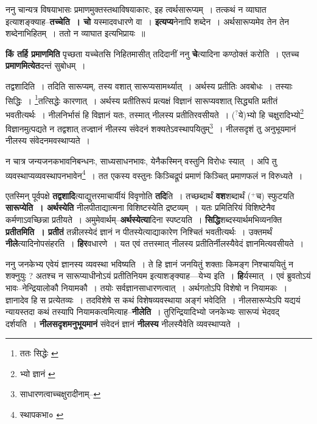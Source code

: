 \documentclass[article,12pt,a4paper]{memoir}
\newcommand{\unclear}[1]{($^{?}$#1)}
\newcommand{\add}[1]{($^{+}$#1)}
\begin{document}
	  \pstart ननु चान्यत्र विषयाभासः प्रमाणमुक्तस्तथाविषयाकारः, इह त्वर्थसारूप्यम् । तत्कथं न व्याघात इत्याशङ्क्याह--\textbf{तच्चेति । चो} यस्मादवधारणे वा । \textbf{इत्यप्य}नेनापि शब्देन । अर्थसारूप्यमेव तेन तेन शब्देनाभिहितम् । ततो न व्याघात इत्यभिप्रायः ॥
	\pend
      

	  \pstart \textbf{किं तर्हि प्रमाणमिति} पृच्छता यच्चेतसि निहितमासीत् तदिदानीं ननु \textbf{चे}त्यादिना कण्ठोक्तं करोति । एतच्च \textbf{प्रमाणमित्येत}दन्तं सुबोधम् ।
	\pend
	  \bigskip
	  \begingroup
	

	  \pstart तद्वशादिति । तदिति सारूप्यम्, तस्य वशात् सारूप्यसामर्थ्यात् । अर्थस्य प्रतीतिः अवबोधः । तस्याः सिद्धिः । \footnote{ततः सिद्धेः \cite{dp-msB}}\-तत्सिद्धेः कारणात् । अर्थस्य प्रतीतिरूपं प्रत्यक्षं विज्ञानं सारूप्यवशात् सिद्ध्यति प्रतीतं भवतीत्यर्थः । नीलनिर्भासं हि विज्ञानं यतः, तस्मात् नीलस्य प्रतीतिरवसीयते । \unclear{ये}भ्यो हि चक्षुरादिभ्यो\footnote{भ्यो ज्ञानं \cite{dp-msD} \cite{dp-msB}} विज्ञानमुत्पद्यते न तद्वशात् तज्ज्ञानं नीलस्य संवेदनं शक्यतेऽवस्थापयितुम्\footnote{साधारणत्वाच्चक्षुरादीनाम्--\cite{dp-msD-n}} । नीलसदृशं तु अनुभूयमानं नीलस्य संवेदनमवस्थाप्यते ।
	\pend
       

	  \pstart न चात्र जन्यजनकभावनिबन्धनः, साध्यसाधनभावः, येनैकस्मिन् वस्तुनि विरोधः स्यात् । अपि तु व्यवस्थाप्यव्यवस्थापनभावेन\footnote{स्थापकभा० \cite{dp-msA} \cite{dp-msB} \cite{dp-msC} \cite{dp-msD} \cite{dp-edP} \cite{dp-edE} \cite{dp-edH} \cite{dp-edN}} । तत एकस्य वस्तुनः किञ्चिद्रूपं प्रमाणं किञ्चित् प्रमाणफलं न विरुध्यते ।
	\pend
      
	  \endgroup
	

	  \pstart एतस्मिन् पूर्वपक्षे \textbf{तद्वशादि}त्याद्युत्तरमाचार्यीयं विवृणोति \textbf{तदि}ति । तच्छब्दार्थं \textbf{वश}शब्दार्थं \add{च} स्फुटयति \textbf{सारूप्येति । अर्थस्येति} नीलपीताद्यात्मना विशिष्टस्येति द्रष्टव्यम् । यतः प्रमितिरियं विशिष्टेनैव कर्मणाऽवच्छिन्ना प्रतीयते । अमुमेवार्थम्--\textbf{अर्थस्येत्या}दिना स्पष्टयति । \textbf{सिद्धि}शब्दस्यार्थमभिव्यनक्ति \textbf{प्रतीतमिति । प्रतीतं} तन्नीलस्येदं ज्ञानं न पीतस्येत्याद्याकारेण निश्चितं भवतीत्यर्थः । उक्तमर्थं \textbf{नीले}त्यादिनोपसंहरति । \textbf{हिर}वधारणे । यत एवं तत्तस्मात् नीलस्य प्रतीतिर्नीलस्यैवेदं ज्ञानमित्यवसीयते ।
	\pend
      

	  \pstart ननु जनकेभ्य एवेयं ज्ञानस्य व्यवस्था भविष्यति । ते हि ज्ञानं जनयितुं शक्ताः किमङ्ग निश्चाययितुं न शक्नुयुः ? अतश्च न सारूप्याधीनोऽयं प्रतीतिनियम इत्याशङ्क्याह—येभ्य इति । \textbf{हि}र्यस्मात् । एवं ब्रुवतोऽयं भावः--नेन्द्रियालोकौ नियामकौ । तयोः सर्वज्ञानसाधारणत्वात् । अर्थगतोऽपि विशेषो न नियामकः । ज्ञानादेव हि स प्रत्येतव्यः । तदविशेषे स कथं विशेषव्यवस्थाया अङ्गं भवेदिति । नीलसारूप्येऽपि यद्ययं न्यायस्तदा कथं तस्यापि नियामकत्वमित्याह--\textbf{नीलेति} । तुरिन्द्रियादिभ्यो जनकेभ्यः सारूप्यं भेदवद् दर्शयति । \textbf{नीलसदृशमनुभूयमानं} संवेदनं ज्ञानं \textbf{नीलस्य} नीलस्यैवेति व्यवस्थाप्यते ।
	\pend
      
\end{document}
